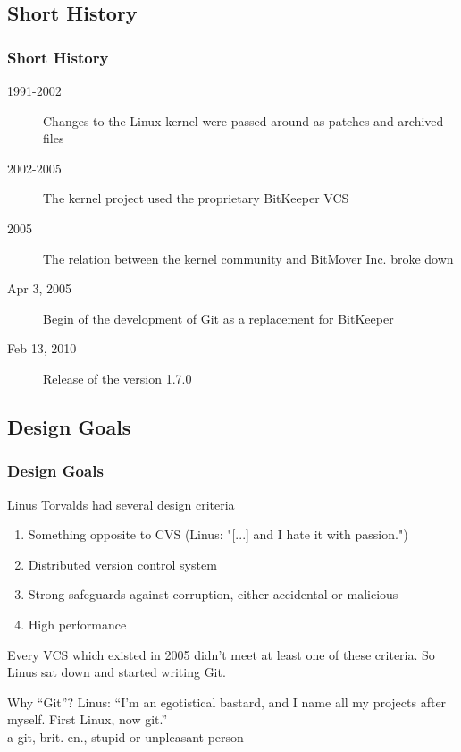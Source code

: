 \documentclass{beamer}
\begin{document}
\subsection*{Short History}
\begin{frame}
  \frametitle{Short History}
  \begin{description}
    \item[1991-2002] Changes to the Linux kernel were passed around as patches and archived files
    \item[2002-2005] The kernel project used the proprietary BitKeeper VCS
    \item[2005] The relation between the kernel community and BitMover Inc. broke down
    \item[Apr 3, 2005] Begin of the development of Git as a replacement for BitKeeper
    \item[Feb 13, 2010] Release of the version 1.7.0
  \end{description}
\end{frame}

\subsection*{Design Goals}
\begin{frame}
  \frametitle{Design Goals}
  \begin{block}{Linus Torvalds had several design criteria}
    \begin{enumerate}
      \item Something opposite to CVS (Linus: "[...] and I hate it with passion.")
      \item Distributed version control system
      \item Strong safeguards against corruption, either accidental or malicious
      \item High performance
    \end{enumerate}
    Every VCS which existed in 2005 didn't meet at least one of these criteria. So Linus sat down and started writing Git.
  \end{block}

  \begin{small}
    Why ``Git''? Linus: ``I'm an egotistical bastard, and I name all my projects after myself. First Linux, now git.''\\
    \tiny a git, brit. en., stupid or unpleasant person
  \end{small}
\end{frame}
\end{document}
